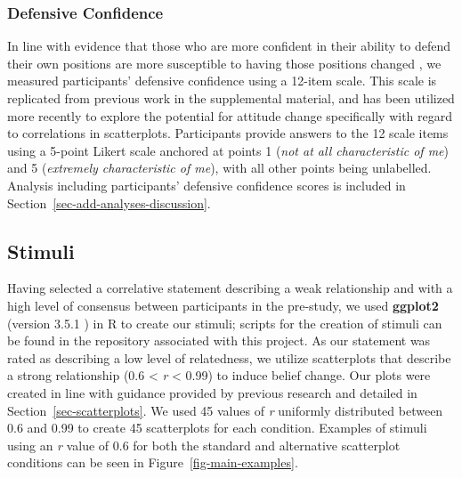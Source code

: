\documentclass[manuscript,screen,review,anonymous]{acmart}
\begin{document}
\subsubsection{Defensive Confidence}\label{sec-def-con}

In line with evidence that those who are more confident in their ability
to defend their own positions are more susceptible to having those
positions changed \citep{albarracin_2004}, we measured participants'
defensive confidence using a 12-item scale. This scale is replicated
from previous work in the supplemental material, and has been utilized
more recently \citep{markant_2023} to explore the potential for attitude
change specifically with regard to correlations in scatterplots.
Participants provide answers to the 12 scale items using a 5-point
Likert scale anchored at points 1 (\emph{not at all characteristic of
me}) and 5 (\emph{extremely characteristic of me}), with all other
points being unlabelled. Analysis including participants' defensive
confidence scores is included in
Section~\ref{sec-add-analyses-discussion}.

\subsection{Stimuli}\label{sec-stimuli-main}

Having selected a correlative statement describing a weak relationship
and with a high level of consensus between participants in the
pre-study, we used \textbf{ggplot2} (version 3.5.1 \citep{ggplot}) in R
to create our stimuli; scripts for the creation of stimuli can be found
in the repository associated with this project. As our statement was
rated as describing a low level of relatedness, we utilize scatterplots
that describe a strong relationship (0.6 \textless{} \emph{r}
\textless{} 0.99) to induce belief change. Our plots were created in
line with guidance provided by previous research and detailed in
Section~\ref{sec-scatterplots}. We used 45 values of \emph{r} uniformly
distributed between 0.6 and 0.99 to create 45 scatterplots for each
condition. Examples of stimuli using an \emph{r} value of 0.6 for both
the standard and alternative scatterplot conditions can be seen in
Figure~\ref{fig-main-examples}.
\end{document}
